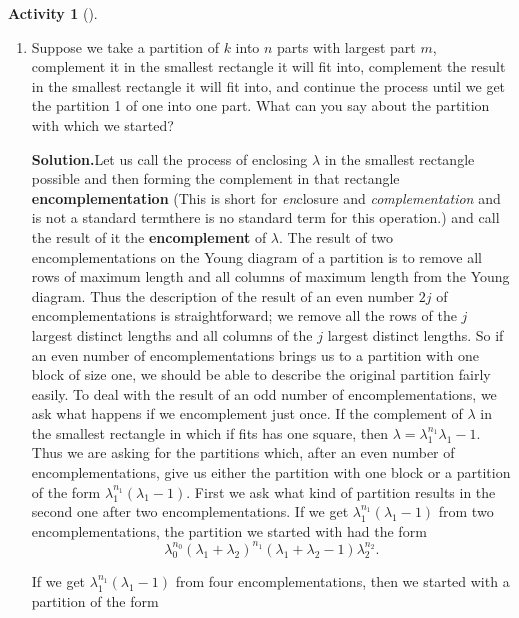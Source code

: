 \documentclass[10pt,]{book}
\newcommand{\terminology}[1]{\textbf{#1}}
\theoremstyle{plain}
\theoremstyle{definition}
\newtheorem{activity}[project]{Activity}
\numberwithin{equation}{chapter}
\begin{document}
\begin{activity}[]\label{activity-90}
~\par
\begin{enumerate}[label=(\alph*)]
 \item Suppose we take a partition of \(k\) into \(n\) parts with largest part \(m\), complement it in the smallest rectangle it will fit into, complement the result in the smallest rectangle it will fit into, and continue the process until we get the partition 1 of one into one part.  What can you say about the partition with which we started?%
\par\medskip\noindent%
\textbf{Solution.}\quad Let us call the process of enclosing \(\lambda\) in the smallest rectangle possible and then forming the complement in that rectangle \terminology{encomplementation} (This is short for \emph{en}\/closure and \emph{complementation} and is not a standard term\textemdash{}there is no standard term for this operation.) and call the result of it the \terminology{encomplement} of \(\lambda\).  The result of two encomplementations on the Young diagram of a partition is to remove all rows of maximum length and all columns of maximum length from the Young diagram. Thus the description of the result of an even number \(2j\) of encomplementations is straightforward; we remove all the rows of the \(j\) largest distinct lengths and all columns of the \(j\) largest distinct lengths. So if an even number of encomplementations brings us to a partition with one block of size one, we should be able to describe the original partition fairly easily. To deal with the result of an odd number of encomplementations, we ask what happens if we encomplement just once.  If the complement of \(\lambda\) in the smallest rectangle in which if fits has one square, then \(\lambda =\lambda_1^{n_1}\lambda_1-1\). Thus we are asking for the partitions which, after an even number of encomplementations, give us either the partition with one block or a partition of the form \(\lambda_1^{n_1}(\lambda_1-1)\). First we ask what kind of partition results in the second one after two encomplementations. If we get \(\lambda_1^{n_1}(\lambda_1-1)\) from two encomplementations, the partition we started with had the form%
\begin{equation*}
\lambda_0^{n_0}(\lambda_1+\lambda_{2})^{n_1}(\lambda_1+
\lambda_2-1)\lambda_2^{n_2}.
\end{equation*}
%
\par
If we get \(\lambda_1^{n_1}(\lambda_1-1)\) from four encomplementations, then we started with a partition of the form%

\end{enumerate}
\end{activity}
\end{document}
